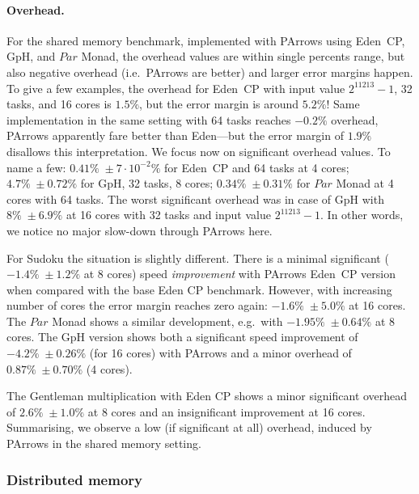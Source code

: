 \documentclass{jfp1}
\newcommand{\Conid}[1]{\mathit{#1}}
\DeclareRobustCommand{\hairspn}{\hspace{1pt}\nolinebreak}%
\DeclareRobustCommand{\ie}{{i.\hairspn{}e.~}}
\DeclareRobustCommand{\eg}{{e.\hairspn{}g.~}}
\begin{document}
\paragraph{Overhead.}

For the shared memory \rmtest benchmark, implemented with PArrows using Eden~CP, GpH, and \ensuremath{\Conid{Par}} Monad, the overhead values are within single percents range, but also negative overhead (\ie PArrows are better) and larger error margins happen. To give a few examples, the overhead for Eden~CP with input value $2^{11213}-1$, 32 tasks, and 16 cores is $1.5\%$, but the error margin is around $5.2\%$! Same implementation in the same setting with 64 tasks reaches $-0.2\%$ overhead, PArrows apparently fare better than Eden---but the error margin of $1.9\%$ disallows this interpretation. We focus now on significant overhead values. To name a few: $0.41\%\; \pm 7\cdot 10^{-2}\%$ for Eden~CP and 64 tasks at 4 cores; $4.7\% \; \pm 0.72\%$ for GpH, 32 tasks, 8 cores; $0.34\% \; \pm 0.31\%$ for \ensuremath{\Conid{Par}} Monad at 4 cores with 64 tasks. The worst significant overhead was in case of GpH  with $8\% \; \pm 6.9\%$ at 16 cores with 32 tasks and input value $2^{11213}-1$. In other words, we notice no major slow-down through PArrows here.

For Sudoku the situation is slightly different. There is a minimal significant ($-1.4\% \; \pm 1.2\%$ at 8 cores) speed \emph{improvement} with PArrows Eden~CP version when compared with the base Eden CP benchmark. However, with increasing number of cores the error margin reaches zero again: $-1.6\% \; \pm 5.0\%$ at 16 cores. The \ensuremath{\Conid{Par}} Monad shows a similar development, \eg with $-1.95\% \; \pm 0.64\%$ at 8 cores. The GpH version shows both a significant speed improvement of $-4.2\% \; \pm 0.26\%$ (for 16 cores) with PArrows and a minor overhead of $0.87\% \; \pm 0.70\%$ (4 cores).

The Gentleman multiplication with Eden CP shows a minor significant overhead of $2.6\% \; \pm 1.0\%$ at 8 cores and an insignificant improvement at 16 cores. Summarising, we observe a low (if significant at all) overhead, induced by PArrows in the shared memory setting.

\subsubsection{Distributed memory}
\label{sec:pref-dm}
\end{document}
